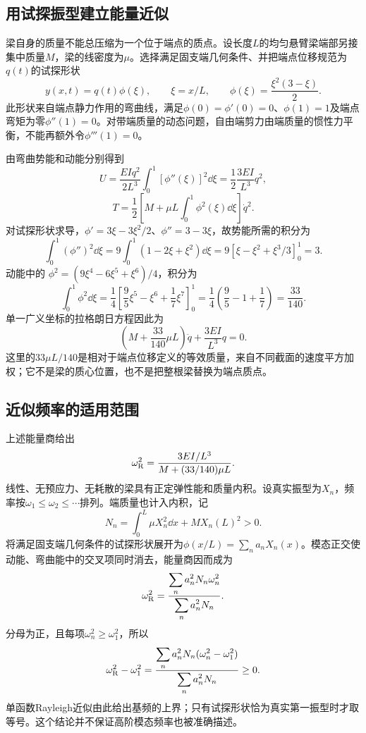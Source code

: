 \subsection{用试探振型建立能量近似}
梁自身的质量不能总压缩为一个位于端点的质点。设长度$L$的均匀悬臂梁端部另接集中质量$M$，梁的线密度为$\mu$。选择满足固支端几何条件、并把端点位移规范为$q(t)$的试探形状
\[
 y(x,t)=q(t)\phi(\xi),\qquad
 \xi=x/L,\qquad
 \phi(\xi)=\frac{\xi^2(3-\xi)}2.
\]
此形状来自端点静力作用的弯曲线，满足$\phi(0)=\phi'(0)=0$、$\phi(1)=1$及端点弯矩为零$\phi''(1)=0$。对带端质量的动态问题，自由端剪力由端质量的惯性力平衡，不能再额外令$\phi'''(1)=0$。

由弯曲势能和动能分别得到
\[
 U=\frac{EIq^2}{2L^3}\int_0^1[\phi''(\xi)]^2\dd\xi
 =\frac12\frac{3EI}{L^3}q^2,
\]
\[
 T=\frac12\left[M+\mu L\int_0^1\phi^2(\xi)\dd\xi\right]\dot q^2.
\]
对试探形状求导，$\phi'=3\xi-3\xi^2/2$、$\phi''=3-3\xi$，故势能所需的积分为
\[
\int_0^1(\phi'')^2\dd\xi=9\int_0^1(1-2\xi+\xi^2)\dd\xi
=9[\xi-\xi^2+\xi^3/3]_0^1=3.
\]
动能中的 $\phi^2=(9\xi^4-6\xi^5+\xi^6)/4$，积分为
\[
 \int_0^1\phi^2\dd\xi
 =\frac14\left[\frac95\xi^5-\xi^6+\frac17\xi^7\right]_0^1
 =\frac14\left(\frac95-1+\frac17\right)=\frac{33}{140}.
\]
单一广义坐标的拉格朗日方程因此为
\[
 \left(M+\frac{33}{140}\mu L\right)\ddot q+
 \frac{3EI}{L^3}q=0.
\]
这里的$33\mu L/140$是相对于端点位移定义的等效质量，来自不同截面的速度平方加权；它不是梁的质心位置，也不是把整根梁替换为端点质点。
\subsection{近似频率的适用范围}
上述能量商给出
\[
 \omega_{\rm R}^2=
 \frac{3EI/L^3}{M+(33/140)\mu L}.
\]
线性、无预应力、无耗散的梁具有正定弹性能和质量内积。设真实振型为$X_n$，频率按$\omega_1\le\omega_2\le\cdots$排列。端质量也计入内积，记
\[
 N_n=\int_0^L\mu X_n^2\dd x+M X_n(L)^2>0.
\]
将满足固支端几何条件的试探形状展开为$\phi(x/L)=\sum_n a_nX_n(x)$。模态正交使动能、弯曲能中的交叉项同时消去，能量商因而成为
\[
 \omega_{\rm R}^2
 =\frac{\displaystyle\sum_n a_n^2N_n\omega_n^2}
 {\displaystyle\sum_n a_n^2N_n}.
\]
分母为正，且每项$\omega_n^2\ge\omega_1^2$，所以
\[
 \omega_{\rm R}^2-\omega_1^2
 =\frac{\displaystyle\sum_n a_n^2N_n(\omega_n^2-\omega_1^2)}
 {\displaystyle\sum_n a_n^2N_n}\ge0.
\]
单函数Rayleigh近似由此给出基频的上界；只有试探形状恰为真实第一振型时才取等号。这个结论并不保证高阶模态频率也被准确描述。

